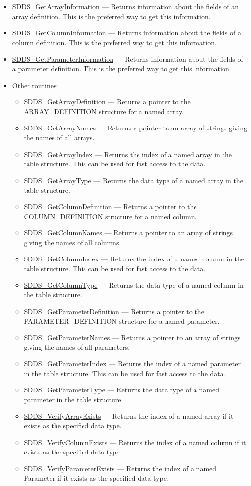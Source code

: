 \documentclass[11pt]{article}
\newcommand{\progref}[1]{\hyperref{SDDS_#1}{{\tt SDDS\_#1} (}{)}{SDDS_#1}}
\begin{document}
\begin{itemize}
\item \progref{GetArrayInformation} --- Returns information about the fields of an array definition. This is the preferred way to get this information.
\item \progref{GetColumnInformation} --- Returns information about the fields of a column definition. This is the preferred way to get this information.
\item \progref{GetParameterInformation} --- Returns information about the fields of a parameter definition. This is the preferred way to get this information.
\item Other routines:
\begin{itemize}
\item \progref{GetArrayDefinition} --- Returns a pointer to the ARRAY\_DEFINITION structure for a named array.
\item \progref{GetArrayNames} --- Returns a pointer to an array of strings giving the names of all arrays.
\item \progref{GetArrayIndex} --- Returns the index of a named array in the table structure. This can be used for fast access to the data.
\item \progref{GetArrayType} --- Returns the data type of a named array in the table structure.
\item \progref{GetColumnDefinition} --- Returns a pointer to the COLUMN\_DEFINITION structure for a named column.
\item \progref{GetColumnNames} --- Returns a pointer to an array of strings giving the names of all columns.
\item \progref{GetColumnIndex} --- Returns the index of a named column in the table structure. This can be used for fast access to the data.
\item \progref{GetColumnType} --- Returns the data type of a named column in the table structure.
\item \progref{GetParameterDefinition} --- Returns a pointer to the PARAMETER\_DEFINITION structure for a named parameter.
\item \progref{GetParameterNames} --- Returns a pointer to an array of strings giving the names of all parameters.
\item \progref{GetParameterIndex} --- Returns the index of a named parameter in the table structure. This can be used for fast access to the data.
\item \progref{GetParameterType} --- Returns the data type of a named parameter in the table structure.
\item \progref{VerifyArrayExists} --- Returns the index of a named array if it exists as the specified data type.
\item \progref{VerifyColumnExists} --- Returns the index of a named column if it exists as the specified data type.
\item \progref{VerifyParameterExists} --- Returns the index of a named Parameter if it exists as the specified data type.
\end{itemize}
\end{itemize}
\end{document}
